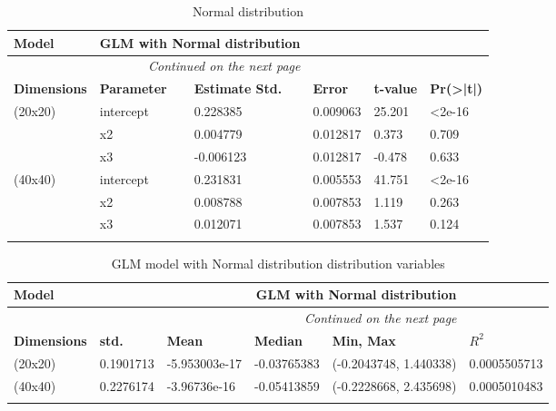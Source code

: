 \documentclass[12pt,a4paper,twoside]{article}
\begin{document}
\begin{longtable}{l|p{}|p{}|p{}|p{}|p{}}
	\textbf{Model} & \multicolumn{2}{r}{GLM with Normal distribution} \\
	\hline
	\endhead
	\hline
	\multicolumn{3}{r}{\emph{Continued on the next page}}    \\
	\endfoot
	\hline
	\endlastfoot
	\hline
	\textbf{Dimensions} & \textbf{Parameter} & \textbf{Estimate Std.}   & \textbf{Error}  & \textbf{t-value} & \textbf{Pr(>|t|)} \\
    \hline
	(20x20)             & intercept          &  0.228385                &  0.009063       &  25.201          &  <2e-16           \\
                        & x2                 &  0.004779                &  0.012817       &  0.373           &  0.709            \\
                        & x3                 & -0.006123                &  0.012817       & -0.478           &  0.633            \\
    \hline
    (40x40)             & intercept          &  0.231831                &  0.005553       &  41.751          &  <2e-16           \\
                        & x2                 &  0.008788                &  0.007853       &  1.119           &  0.263            \\
                        & x3                 &  0.012071                &  0.007853       &  1.537           &  0.124            \\
	\caption{Normal distribution}
	\label{tab:gaussiantab}
\end{longtable}

\begin{longtable}{l|p{}|p{}|p{}|p{}|p{}}
	\textbf{Model} & \multicolumn{4}{r}{GLM with Normal distribution } \\
	\hline
	\endhead
	\hline
	\multicolumn{5}{r}{\emph{Continued on the next page}} \\
	\endfoot
	\hline
	\endlastfoot
	\hline
	\textbf{Dimensions} & \textbf{std.}    & \textbf{Mean}             & \textbf{Median}    & \textbf{Min, Max}             & \textbf{$R^2$} \\
    \hline
    (20x20)             & \small 0.1901713 & \scriptsize -5.953003e-17 & \small -0.03765383 & \small (-0.2043748, 1.440338) &  0.0005505713  \\
    \hline
    (40x40)             & \small 0.2276174 & \scriptsize -3.96736e-16  & \small -0.05413859 & \small (-0.2228668, 2.435698) & 0.0005010483   \\
	\caption{GLM model with Normal distribution distribution variables}
	\label{tab:gammavaltab}
\end{longtable}
\end{document}
